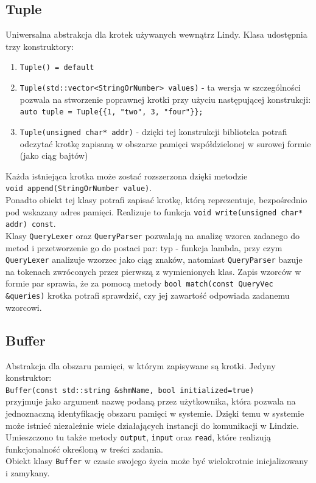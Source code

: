 \documentclass[a4paper]{article}
\begin{document}
	\subsection{Tuple}
	Uniwersalna abstrakcja dla krotek używanych wewnątrz Lindy. Klasa udostępnia trzy konstruktory: \\
	\begin{enumerate}
		\item \texttt{Tuple() = default}
		\item \texttt{Tuple(std::vector<StringOrNumber> values)} - ta wersja w szczególności pozwala na stworzenie poprawnej krotki przy użyciu następującej konstrukcji: \texttt{auto tuple = Tuple\{\{1, "two", 3, "four"\}\};}
		\item \texttt{Tuple(unsigned char* addr)} - dzięki tej konstrukcji biblioteka potrafi odczytać krotkę zapisaną w obszarze pamięci współdzielonej w surowej formie (jako ciąg bajtów)
	\end{enumerate}
	Każda istniejąca krotka może zostać rozszerzona dzięki metodzie \\ \texttt{void append(StringOrNumber value)}. \\
	Ponadto obiekt tej klasy potrafi zapisać krotkę, którą reprezentuje, bezpośrednio pod wskazany adres pamięci. Realizuje to funkcja \texttt{void write(unsigned char* addr) const}. \\
	Klasy \texttt{QueryLexer} oraz \texttt{QueryParser} pozwalają na analizę wzorca zadanego do metod i przetworzenie go do postaci par: typ - funkcja lambda, przy czym \texttt{QueryLexer} analizuje wzorzec jako ciąg znaków, natomiast \texttt{QueryParser} bazuje na tokenach zwróconych przez pierwszą z wymienionych klas. Zapis wzorców w formie par sprawia, że za pomocą metody \texttt{bool match(const QueryVec \&queries)} krotka potrafi sprawdzić, czy jej zawartość odpowiada zadanemu wzorcowi.
	
	\subsection{Buffer}
	Abstrakcja dla obszaru pamięci, w którym zapisywane są krotki. Jedyny konstruktor:\\
	\texttt{Buffer(const std::string \&shmName, bool initialized=true)}\\
	przyjmuje jako argument nazwę podaną przez użytkownika, która pozwala na jednoznaczną identyfikację obszaru pamięci w systemie. Dzięki temu w systemie może istnieć niezależnie wiele działających instancji do komunikacji w Lindzie. \\
	Umieszczono tu także metody \texttt{output}, \texttt{input} oraz \texttt{read}, które realizują funkcjonalność określoną w treści zadania. \\
	Obiekt klasy \texttt{Buffer} w czasie swojego życia może być wielokrotnie inicjalizowany i zamykany.
	
\end{document}
